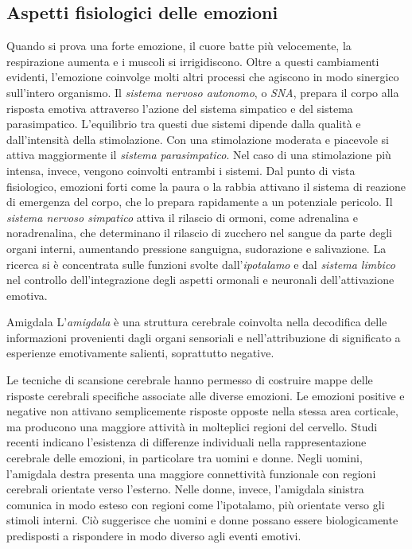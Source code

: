 \documentclass[a4paper]{article}
\begin{document}
\subsection{Aspetti fisiologici delle emozioni}
Quando si prova una forte emozione, il cuore batte più velocemente, la respirazione aumenta e i muscoli si irrigidiscono. Oltre a questi cambiamenti evidenti, l'emozione coinvolge molti altri processi che agiscono in modo sinergico sull'intero organismo.
Il \emph{sistema nervoso autonomo}, o \emph{SNA}, prepara il corpo alla risposta emotiva attraverso l'azione del sistema simpatico e del sistema parasimpatico. L'equilibrio tra questi due sistemi dipende dalla qualità e dall'intensità della stimolazione.
Con una stimolazione moderata e piacevole si attiva maggiormente il \emph{sistema parasimpatico}. Nel caso di una stimolazione più intensa, invece, vengono coinvolti entrambi i sistemi.
Dal punto di vista fisiologico, emozioni forti come la paura o la rabbia attivano il sistema di reazione di emergenza del corpo, che lo prepara rapidamente a un potenziale pericolo. Il \emph{sistema nervoso simpatico} attiva il rilascio di ormoni, come adrenalina e noradrenalina, che determinano il rilascio di zucchero nel sangue da parte degli organi interni, aumentando pressione sanguigna, sudorazione e salivazione.
La ricerca si è concentrata sulle funzioni svolte dall'\emph{ipotalamo} e dal \emph{sistema limbico} nel controllo dell'integrazione degli aspetti ormonali e neuronali dell'attivazione emotiva.
\begin{snippetdefinition}{Amigdala}
    L'\emph{amigdala} è una struttura cerebrale coinvolta nella decodifica delle informazioni provenienti dagli organi sensoriali e nell'attribuzione di significato a esperienze emotivamente salienti, soprattutto negative.
\end{snippetdefinition}
Le tecniche di scansione cerebrale hanno permesso di costruire mappe delle risposte cerebrali specifiche associate alle diverse emozioni. Le emozioni positive e negative non attivano semplicemente risposte opposte nella stessa area corticale, ma producono una maggiore attività in molteplici regioni del cervello.
Studi recenti indicano l'esistenza di differenze individuali nella rappresentazione cerebrale delle emozioni, in particolare tra uomini e donne. Negli uomini, l'amigdala destra presenta una maggiore connettività funzionale con regioni cerebrali orientate verso l'esterno. Nelle donne, invece, l'amigdala sinistra comunica in modo esteso con regioni come l'ipotalamo, più orientate verso gli stimoli interni. Ciò suggerisce che uomini e donne possano essere biologicamente predisposti a rispondere in modo diverso agli eventi emotivi.
\end{document}
